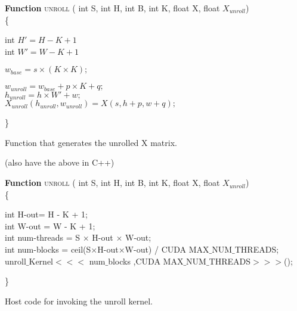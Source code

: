 \documentclass[7pt]{article}
\begin{document}
\begin{algorithm}
	\vspace{0.1in}
	{\textbf{Function} \textsc{unroll} ( int S, int H, int B, int K, float X, float $X_{unroll}$)}\\
	\{
	\vspace{0.05in}
	
	
	int $H' = H - K + 1$ \\
	int $W' = W - K + 1$ \\

	
	
	\vspace{0.05in}
	
	
	{
		$w_{base} = s\times (K \times K);$ \\
		{
			{
			{
				{
					$w_{unroll} = w_{base} + p \times K + q;$ \\
					$h_{unroll} = h \times W' + w;$ \\
					$X_{unroll}(h_{unroll}, w_{unroll}) = X(s, h+p, w + q);$
					
				}
				
			}	
			}
		}
	}
	\}
	\caption{Function that generates the unrolled X matrix.}
\end{algorithm}
(also have the above in C++)
\begin{algorithm}
	\vspace{0.1in}
	{\textbf{Function} \textsc{unroll} ( int S, int H, int B, int K, float X, float $X_{unroll}$)}\\
	\hspace{0.25cm}	\{
	\vspace{0.05in}
	
	
	\hspace{1.0cm}	int H-out= H - K + 1;\\
	\hspace{1.0cm}	int W-out  = W - K + 1;\\
	\hspace{1.0cm}	int num-threads = S $\times$ H-out $\times$ W-out; \\
	\hspace{1.0cm}	int num-blocks = ceil(S$\times$H-out$\times$W-out)  / CUDA MAX$\_$NUM$\_$THREADS; \\
	\hspace{1.0cm}	unroll$\_$Kernel$<<<$ num$\_$blocks ,CUDA MAX$\_$NUM$\_$THREADS$>>>$();

\hspace{0.25cm}		\}
	\caption{Host code for invoking the unroll kernel.}
\end{algorithm}
\end{document}
